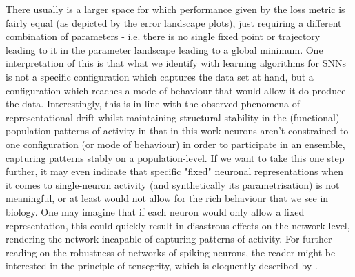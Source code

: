 \documentclass[mphil,deptreport,ianc]{infthesis} %
\begin{document}
There usually is a larger space for which performance given by the loss metric is fairly equal (as depicted by the error landscape plots), just requiring a different combination of parameters - i.e. there is no single fixed point or trajectory leading to it in the parameter landscape leading to a global minimum.
One interpretation of this is that what we identify with learning algorithms for SNNs is not a specific configuration which captures the data set at hand, but a configuration which reaches a mode of behaviour that would allow it do produce the data.
Interestingly, this is in line with the observed phenomena of representational drift whilst maintaining structural stability in the (functional) population patterns of activity \cite{Deitch2021RepresentationalCortex} in that in this work neurons aren't constrained to one configuration (or mode of behaviour) in order to participate in an ensemble, capturing patterns stably on a population-level.
If we want to take this one step further, it may even indicate that specific "fixed" neuronal representations when it comes to single-neuron activity (and synthetically its parametrisation) is not meaningful, or at least would not allow for the rich behaviour that we see in biology. One may imagine that if each neuron would only allow a fixed representation, this could quickly result in disastrous effects on the network-level, rendering the network incapable of capturing patterns of activity. For further reading on the robustness of networks of spiking neurons, the reader might be interested in the principle of tensegrity, which is eloquently described by \cite{Buzsaki2006}.
\end{document}
